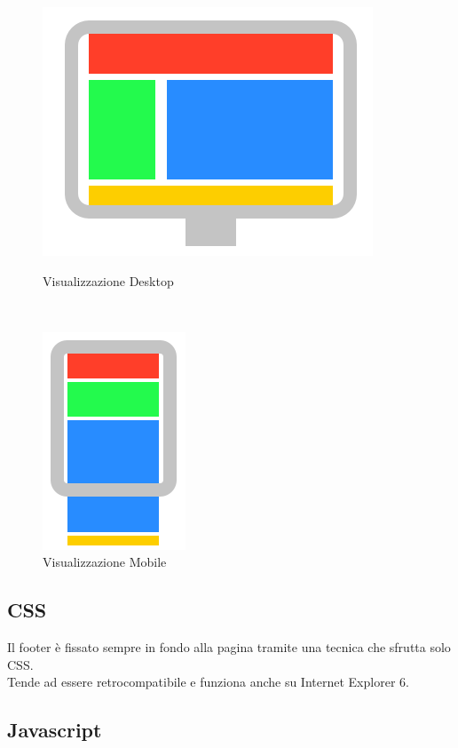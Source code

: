 \documentclass[12pt]{article}
\begin{document}
	
	\begin{figure}
 		\begin{minipage}[b]{8.5cm}
  		 \centering
   		\includegraphics[angle=0,scale=.7]{img/layout1.png}
   		\caption{Visualizzazione Desktop}
 		\end{minipage}
 	\ \hspace{2mm} \hspace{3mm} \
		 \begin{minipage}[b]{8.5cm}
  		\centering
   		\includegraphics[angle=0,scale=.7]{img/layout2.png}
   		\caption{Visualizzazione Mobile}
 		\end{minipage}
	\end{figure}
	
	\subsection{CSS}
	
	Il footer è fissato sempre in fondo alla pagina tramite una tecnica che sfrutta solo CSS.\\
	Tende ad essere retrocompatibile e funziona anche su Internet Explorer 6.	

	
	\subsection{Javascript}
	
\end{document}
